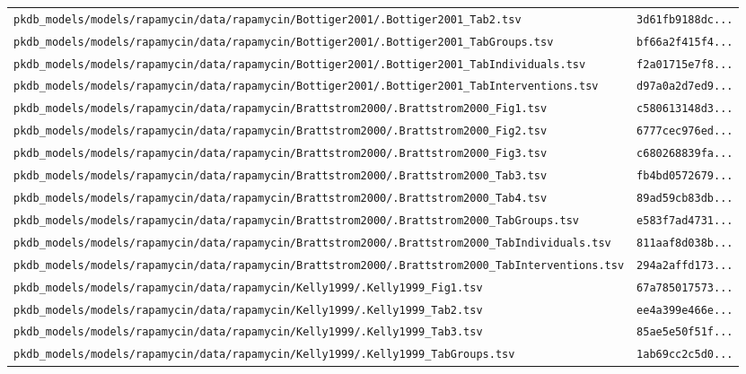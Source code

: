 \documentclass{article}
\begin{document}
\begin{longtable}{ll}
\texttt{pkdb\_models/models/rapamycin/data/rapamycin/Bottiger2001/.Bottiger2001\_Tab2.tsv} & \texttt{3d61fb9188dc...} \\
\texttt{pkdb\_models/models/rapamycin/data/rapamycin/Bottiger2001/.Bottiger2001\_TabGroups.tsv} & \texttt{bf66a2f415f4...} \\
\texttt{pkdb\_models/models/rapamycin/data/rapamycin/Bottiger2001/.Bottiger2001\_TabIndividuals.tsv} & \texttt{f2a01715e7f8...} \\
\texttt{pkdb\_models/models/rapamycin/data/rapamycin/Bottiger2001/.Bottiger2001\_TabInterventions.tsv} & \texttt{d97a0a2d7ed9...} \\
\texttt{pkdb\_models/models/rapamycin/data/rapamycin/Brattstrom2000/.Brattstrom2000\_Fig1.tsv} & \texttt{c580613148d3...} \\
\texttt{pkdb\_models/models/rapamycin/data/rapamycin/Brattstrom2000/.Brattstrom2000\_Fig2.tsv} & \texttt{6777cec976ed...} \\
\texttt{pkdb\_models/models/rapamycin/data/rapamycin/Brattstrom2000/.Brattstrom2000\_Fig3.tsv} & \texttt{c680268839fa...} \\
\texttt{pkdb\_models/models/rapamycin/data/rapamycin/Brattstrom2000/.Brattstrom2000\_Tab3.tsv} & \texttt{fb4bd0572679...} \\
\texttt{pkdb\_models/models/rapamycin/data/rapamycin/Brattstrom2000/.Brattstrom2000\_Tab4.tsv} & \texttt{89ad59cb83db...} \\
\texttt{pkdb\_models/models/rapamycin/data/rapamycin/Brattstrom2000/.Brattstrom2000\_TabGroups.tsv} & \texttt{e583f7ad4731...} \\
\texttt{pkdb\_models/models/rapamycin/data/rapamycin/Brattstrom2000/.Brattstrom2000\_TabIndividuals.tsv} & \texttt{811aaf8d038b...} \\
\texttt{pkdb\_models/models/rapamycin/data/rapamycin/Brattstrom2000/.Brattstrom2000\_TabInterventions.tsv} & \texttt{294a2affd173...} \\
\texttt{pkdb\_models/models/rapamycin/data/rapamycin/Kelly1999/.Kelly1999\_Fig1.tsv} & \texttt{67a785017573...} \\
\texttt{pkdb\_models/models/rapamycin/data/rapamycin/Kelly1999/.Kelly1999\_Tab2.tsv} & \texttt{ee4a399e466e...} \\
\texttt{pkdb\_models/models/rapamycin/data/rapamycin/Kelly1999/.Kelly1999\_Tab3.tsv} & \texttt{85ae5e50f51f...} \\
\texttt{pkdb\_models/models/rapamycin/data/rapamycin/Kelly1999/.Kelly1999\_TabGroups.tsv} & \texttt{1ab69cc2c5d0...} \\

\end{longtable}
\end{document}
